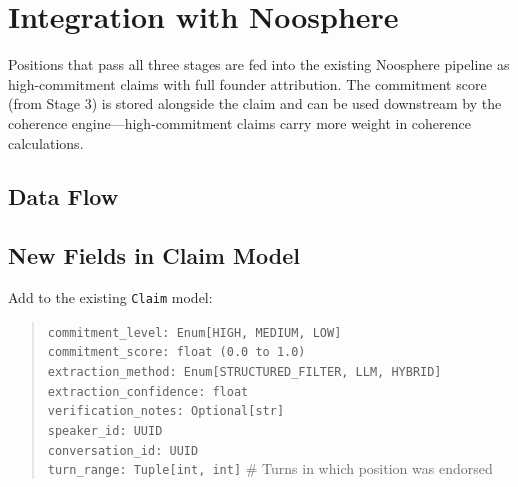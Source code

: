 \documentclass[11pt,letterpaper]{article}
\begin{document}
\section{Integration with Noosphere}

Positions that pass all three stages are fed into the existing Noosphere pipeline as high-commitment claims with full founder attribution. The commitment score (from Stage 3) is stored alongside the claim and can be used downstream by the coherence engine—high-commitment claims carry more weight in coherence calculations.

\subsection{Data Flow}

\begin{center}
\end{center}

\subsection{New Fields in Claim Model}

Add to the existing \texttt{Claim} model:

\begin{quote}
\texttt{commitment\_level: Enum[HIGH, MEDIUM, LOW]}\\
\texttt{commitment\_score: float (0.0 to 1.0)}\\
\texttt{extraction\_method: Enum[STRUCTURED\_FILTER, LLM, HYBRID]}\\
\texttt{extraction\_confidence: float}\\
\texttt{verification\_notes: Optional[str]}\\
\texttt{speaker\_id: UUID}\\
\texttt{conversation\_id: UUID}\\
\texttt{turn\_range: Tuple[int, int]}  \# Turns in which position was endorsed
\end{quote}
\end{document}
